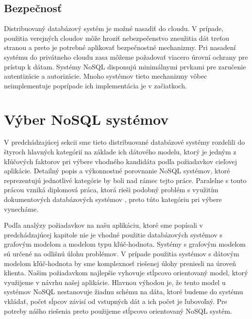 \documentclass[11pt,twoside,a4paper]{book}
\begin{document}
\subsection{Bezpečnosť}
Distribuovaný databázový systém je možné nasadiť do cloudu. V prípade, použitia verejných cloudov môže hroziť nebezpečenstvo zneužitia dát treťou stranou a preto je potrebné aplikovať bezpečnostné mechanizmy. Pri nasadení systému do privátneho cloudu zasa môžeme požadovať viacero úrovní ochrany pre prístup k dátam. Systémy NoSQL disponujú minimálnymi prvkami pre zaručenie autentizácie a autorizácie. Mnoho systémov tieto mechanizmy vôbec neimplementuje poprípade ich implementácia je v začiatkoch.



\section{Výber NoSQL systémov}

V predchádzajúcej sekcii sme tieto distribuované databázové systémy rozdelili do štyroch hlavných kategórií na základe ich dátového modelu, ktorý je jedným z kľúčových faktorov pri výbere vhodného kandidáta podľa požiadavkov cieľovej aplikácie. Detailný popis a výkonnostné porovnanie NoSQL systémov, ktoré reprezentujú jednotlivé kategórie by boli nad rámec tejto práce. Paralelne s touto prácou vzniká diplomová práca, ktorá rieši podobný problém s využitím dokumentových databázových systémov  \cite{barina}, preto túto kategóriu pri výbere vynecháme.

Podľa analýzy požiadavkov na našu aplikáciu, ktoré sme popísali v predchádzajúcej kapitole nie je vhodné použitie databázových systémov s grafovým modelom a modelom typu kľúč-hodnota. Systémy s grafovým modelom sú určené na odlišnú úlohu problémov. V prípade použitia systémov s dátovým modelom kľúč-hodnota by sme komplexnosť riešenej úlohy preniesli na úroveň klienta. Našim požiadavkom najlepšie vyhovuje stĺpcovo orientovaný model, ktorý využijeme v návrhu našej aplikácie. Hlavnou výhodou je, že tento model u systémov NoSQL nestanovuje žiadnu schému na dáta, ktoré budeme do systému vkládať, počet sĺpcov závisí od vstupných dát a ich počet je ľubovoľný. Pre potreby nášho riešenia preto použijeme stĺpcovo orientovaný NoSQL systém.
\end{document}
